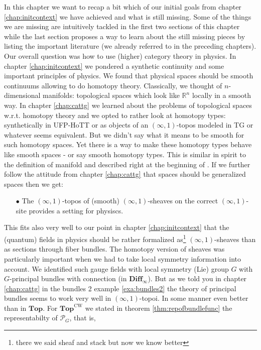 In this chapter we want to recap a bit which of our initial goals from chapter \ref{chap:initcontext} we have achieved and what is still missing. Some of the things we are missing are intuitively tackled in the first two sections of this chapter while the last section proposes a way to learn about the still missing pieces by listing the important literature (we already referred to in the preceding chapters).
\\
Our overall question was how to use (higher) category theory in physics. In chapter \ref{chap:initcontext} we pondered a synthetic continuity and some important principles of physics. We found that physical spaces should be smooth continuums allowing to do homotopy theory. Classically, we thought of $n$-dimensional manifolds: topological spaces which look like $\mathbb{R}^{n}$ locally in a smooth way. In chapter \ref{chap:cattg} we learned about the problems of topological spaces w.r.t. homotopy theory and we opted to rather look at homotopy types: synthetically in UFP-HoTT or as objects of an $(\infty,1)$-topos modeled in TG or whatever seems equivalent. But we didn't say what it means to be {\glqq}smooth{\grqq} for such homotopy spaces. Yet there is a way to make these homotopy types behave like smooth spaces - or say smooth homotopy types. This is similar in spirit to the definition of manifold and described right at the beginning of \cite{a565d200}. If we further follow the attitude from chapter \ref{chap:cattg} that spaces should be generalized spaces then we get:
\begin{enumerate}
\item[$\bullet$]
The $(\infty,1)$-topos of (smooth) $(\infty,1)$-sheaves on the {\glqq}correct{\grqq} $(\infty,1)$-site provides a setting for physiscs.
\end{enumerate}
This fits also very well to our point in chapter \ref{chap:initcontext} that the (quantum) fields in physics should be rather formalized as\footnote{there we said sheaf and stack but now we know better} $(\infty,1)$-sheaves than as sections through fiber bundles. The homotopy version of sheaves was particularly important when we had to take local symmetry information into account. We identified such {\glqq}gauge fields with local symmetry (Lie) group $G${\grqq} with {\glqq}$G$-principal bundles with connection (in $\mathbf{Diff}_{\infty}$){\grqq}. But as we told you in chapter \ref{chap:cattg} in the bundles 2 example \ref{exa:bundles2} the theory of principal bundles seems to work very well in $(\infty,1)$-topoi. In some manner even better than in $\mathbf{Top}$. For $\mathbf{Top}^{\textrm{CW}}$ we stated in theorem \ref{thm:repofbundlefunc} the representabilty of $\mathcal{P}_{G}$, that is,
